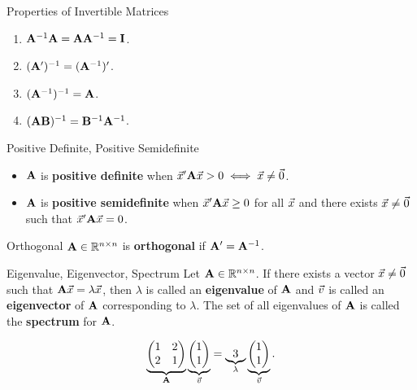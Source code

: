 \begin{Remark}{Properties of Invertible Matrices}{}
    \begin{enumerate}[(1)]
        \item $ \mathbf{A}^{-1}\mathbf{A}=\mathbf{A}\mathbf{A}^{-1}=\mathbf{I} $.
        \item $ (\mathbf{A}')^{-1}=(\mathbf{A}^{-1})' $.
        \item $ (\mathbf{A}^{-1})^{-1}=\mathbf{A} $.
        \item $ (\mathbf{AB})^{-1}=\mathbf{B}^{-1}\mathbf{A}^{-1} $.
    \end{enumerate}
\end{Remark}
\begin{Definition}{Positive Definite, Positive Semidefinite}{}
    \begin{itemize}
        \item $ \mathbf{A} $ is \textbf{positive definite} when $ \vec{x}'\mathbf{A}\vec{x}>0 \iff \vec{x}\ne\vec{0} $.
        \item $ \mathbf{A} $ is \textbf{positive semidefinite} when $ \vec{x}'\mathbf{A}\vec{x}\ge 0 $ for all $ \vec{x} $
              and there exists $ \vec{x}\ne \vec{0} $ such that $ \vec{x}'\mathbf{A}\vec{x}=0 $.
    \end{itemize}
\end{Definition}
\begin{Definition}{Orthogonal}{}
    $ \mathbf{A}\in\mathbb{R}^{n\times n} $ is \textbf{orthogonal} if $ \mathbf{A}'=\mathbf{A}^{-1} $.
\end{Definition}
\begin{Definition}{Eigenvalue, Eigenvector, Spectrum}{}
    Let $ \mathbf{A}\in\mathbb{R}^{n\times n} $. If there exists a vector $ \vec{x}\ne \vec{0} $ such that
    $ \mathbf{A}\vec{x}=\lambda \vec{x} $, then $ \lambda $ is called an \textbf{eigenvalue} of $ \mathbf{A} $
    and $ \vec{v} $ is called an \textbf{eigenvector} of $ \mathbf{A} $ corresponding to $ \lambda $. The
    set of all eigenvalues of $ \mathbf{A} $ is called the \textbf{spectrum} for $ \mathbf{A} $.
\end{Definition}
\begin{Example}{}{}
    \[ \underbrace{\begin{pmatrix}
                1 & 2 \\
                2 & 1
            \end{pmatrix}}_{\mathbf{A}}\underbrace{\begin{pmatrix}
                1 \\
                1
            \end{pmatrix}}_{\vec{v}}=\underbrace{3}_{\lambda}\underbrace{\begin{pmatrix}
                1 \\
                1
            \end{pmatrix}}_{\vec{v}}. \]
\end{Example}
